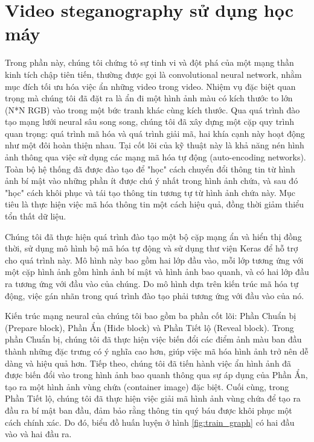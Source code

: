\section{Video steganography sử dụng học máy}
Trong phần này, chúng tôi chứng tỏ sự tinh vi và đột phá của một mạng thần kinh tích chập tiên tiến, thường được gọi là convolutional neural network, nhằm mục đích tối ưu hóa việc ẩn những video trong video. Nhiệm vụ đặc biệt quan trọng mà chúng tôi đã đặt ra là ẩn đi một hình ảnh màu có kích thước to lớn (N*N RGB) vào trong một bức tranh khác cùng kích thước. Qua quá trình đào tạo mạng lưới neural sâu song song, chúng tôi đã xây dựng một cặp quy trình quan trọng: quá trình mã hóa và quá trình giải mã, hai khía cạnh này hoạt động như một đôi hoàn thiện nhau. Tại cốt lõi của kỹ thuật này là khả năng nén hình ảnh thông qua việc sử dụng các mạng mã hóa tự động (auto-encoding networks). Toàn bộ hệ thống đã được đào tạo để "học" cách chuyển đổi thông tin từ hình ảnh bí mật vào những phần ít được chú ý nhất trong hình ảnh chứa, và sau đó "học" cách khôi phục và tái tạo thông tin tương tự từ hình ảnh chứa này. Mục tiêu là thực hiện việc mã hóa thông tin một cách hiệu quả, đồng thời giảm thiểu tổn thất dữ liệu.

Chúng tôi đã thực hiện quá trình đào tạo một bộ cặp mạng ẩn và hiển thị đồng thời, sử dụng mô hình bộ mã hóa tự động và sử dụng thư viện Keras để hỗ trợ cho quá trình này. Mô hình này bao gồm hai lớp đầu vào, mỗi lớp tương ứng với một cặp hình ảnh gồm hình ảnh bí mật và hình ảnh bao quanh, và có hai lớp đầu ra tương ứng với đầu vào của chúng. Do mô hình dựa trên kiến trúc mã hóa tự động, việc gán nhãn trong quá trình đào tạo phải tương ứng với đầu vào của nó.

Kiến trúc mạng neural của chúng tôi bao gồm ba phần cốt lõi: Phần Chuẩn bị (Prepare block), Phần Ẩn (Hide block) và Phần Tiết lộ (Reveal block). Trong phần Chuẩn bị, chúng tôi đã thực hiện việc biến đổi các điểm ảnh màu ban đầu thành những đặc trưng có ý nghĩa cao hơn, giúp việc mã hóa hình ảnh trở nên dễ dàng và hiệu quả hơn. Tiếp theo, chúng tôi đã tiến hành việc ẩn hình ảnh đã được biến đổi vào trong hình ảnh bao quanh thông qua sự áp dụng của Phần Ẩn, tạo ra một hình ảnh vùng chứa (container image) đặc biệt. Cuối cùng, trong Phần Tiết lộ, chúng tôi đã thực hiện việc giải mã hình ảnh vùng chứa để tạo ra đầu ra bí mật ban đầu, đảm bảo rằng thông tin quý báu được khôi phục một cách chính xác. Do đó, biểu đồ huấn luyện ở hình \ref{fig:train_graph} có hai đầu vào và hai đầu ra.

